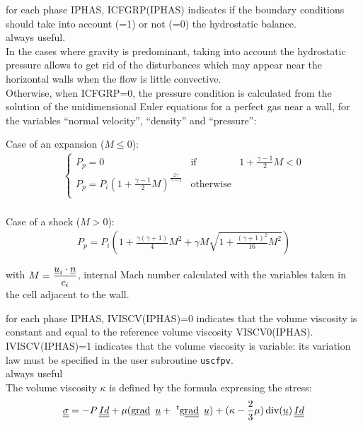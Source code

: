 {for each phase IPHAS, ICFGRP(IPHAS) indicates if the boundary
conditions should take into account (=1) or not (=0) the hydrostatic balance.\\
always useful.\\
In the cases where gravity is predominant, taking into account the hydrostatic
pressure allows to get rid of the disturbances which may appear near the
horizontal walls when the flow is little convective.\\
%
Otherwise, when ICFGRP=0, the pressure condition is calculated
from the solution of the unidimensional Euler equations for a perfect
gas near a wall, for the variables ``normal velocity'', ``density'' and
``pressure'': 
\vspace{0.2cm}
\begin{list}{}{}
\item Case of an expansion ($M \leqslant 0$):\\
$$
\begin{array}{l}
\left\{\begin{array}{lll}
P_p=0 & \text{if} & 1 + \displaystyle\frac{\gamma-1}{2}M<0\\
P_p = P_i \left(1 + \displaystyle\frac{\gamma-1}{2}M\right)
^{\frac{2\gamma}{\gamma-1}} & \text{otherwise}\\
\end{array}\right.\\
\end{array}
$$

\item Case of a shock ($M > 0$):\\
$$
\begin{array}{l}
P_p = P_i \left(1 + \displaystyle\frac{\gamma(\gamma+1)}{4}M^2
+\gamma M \displaystyle\sqrt{1+\displaystyle\frac{(\gamma+1)^2}{16}M^2}\right)
\end{array}
$$

with $M = \displaystyle\frac{\underline{u}_i \cdot \underline{n}}{c_i}$, internal
      Mach number calculated with the variables taken in the cell
      adjacent to the wall.\\

\end{list}
}

{for each phase IPHAS, IVISCV(IPHAS)=0 indicates that the volume
viscosity is constant and equal to the reference volume viscosity
VISCV0(IPHAS).\\ 
IVISCV(IPHAS)=1 indicates that the volume viscosity is variable: its
variation law must be specified in the user subroutine \texttt{uscfpv}.\\
always useful\\
The volume viscosity $\kappa$ is defined by the formula expressing the stress:
\begin{equation}
   \underline{\underline{\sigma}} = -P\,\underline{\underline{Id}} + \mu (\text{g}\underline{\text{rad}}\ \,\underline{u} +  \ ^{t}\text{g}\underline{\underline{\text{rad}}}\ \,\underline{u})
	   +(\kappa-\frac{2}{3}\mu)\,\text{div}(\underline{u})\,\underline{\underline{Id}}
\end{equation}
}

